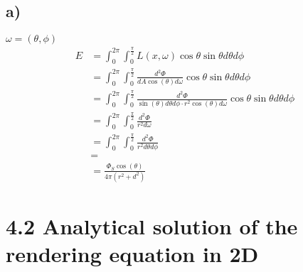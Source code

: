 \documentclass[a4paper]{scrartcl}
\begin{document}
\subsection*{a)}
$\omega = (\theta, \phi)$
\begin{align*}
  E &= \int_{0}^{2\pi} \int_0^{\frac{\pi}{2}} L(x, \omega) \cos \theta \sin \theta d \theta d \phi \\
  &= \int_{0}^{2\pi} \int_0^{\frac{\pi}{2}} \frac{d^2 \Phi}{dA \cos(\theta) d\omega} \cos \theta \sin \theta d \theta d \phi \\
  &= \int_{0}^{2\pi} \int_0^{\frac{\pi}{2}} \frac{d^2 \Phi}{\sin(\theta) d \theta d \phi \cdot r^2 \cos(\theta) d\omega} \cos \theta \sin \theta d \theta d \phi \\
  &= \int_{0}^{2\pi} \int_0^{\frac{\pi}{2}} \frac{d^2 \Phi}{r^2 d \omega} \\
  &= \int_{0}^{2\pi} \int_0^{\frac{\pi}{2}} \frac{d^2 \Phi}{r^2 d \theta d \phi} \\
  &= \\
  &= \frac{\Phi_S \cos(\theta)}{4 \pi(r^2 + d^2)}
\end{align*}

\section*{4.2 Analytical solution of the rendering equation in 2D}
\end{document}
